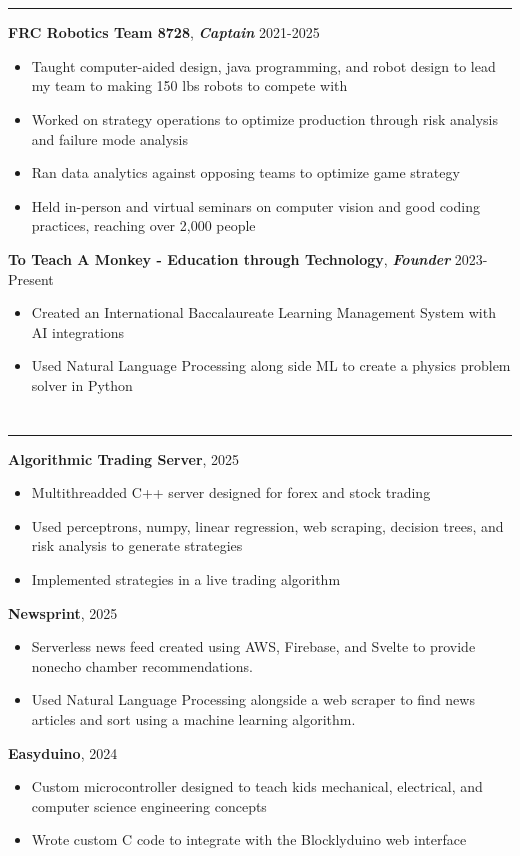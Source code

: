 \documentclass{article}[11pt]
\newcommand{\underlinedsection}[1]{ \section*{\sc{#1}}
	\rule{\textwidth}{1pt} }
\newenvironment{denseitemize}
{ \begin{itemize}[leftmargin = 20pt, topsep = 0pt, itemsep = 0pt] }
{\end{itemize} }
\newcommand{\job}[3]{ {\textbf{#1}, \textit{\textbf{#2}} \hfill {#3}} }
\begin{document}
\underlinedsection{Other experience}
\job{FRC Robotics Team 8728}{Captain}{2021-2025}
\begin{denseitemize}
	\item Taught computer-aided design, java programming, and robot design to lead my team to making 150 lbs robots to compete with
    \item Worked on strategy operations to optimize production through risk analysis and failure mode analysis
    \item Ran data analytics against opposing teams to optimize game strategy
    \item Held in-person and virtual seminars on computer vision and good coding practices, reaching over 2,000 people
\end{denseitemize}
\job{To Teach A Monkey - Education through Technology}{Founder}{2023-Present}
\begin{denseitemize}
	\item Created an International Baccalaureate Learning Management System with AI integrations
    \item Used Natural Language Processing along side ML to create a physics problem solver in Python
\end{denseitemize}
\underlinedsection{Projects}
\job{Algorithmic Trading Server}{}{2025}
\begin{denseitemize}
	\item Multithreadded C++ server designed for forex and stock trading 
    \item Used perceptrons, numpy, linear regression, web scraping, decision trees, and risk analysis to generate strategies
    \item Implemented strategies in a live trading algorithm  
\end{denseitemize}
\job{Newsprint}{}{2025}
\begin{denseitemize}
	\item Serverless news feed created using AWS, Firebase, and Svelte to provide nonecho chamber recommendations.
    \item Used Natural Language Processing alongside a web scraper to find news articles and sort using a machine learning algorithm.
\end{denseitemize}
\job{Easyduino}{}{2024}
\begin{denseitemize}
	\item Custom microcontroller designed to teach kids mechanical, electrical, and computer science engineering concepts
    \item Wrote custom C code to integrate with the Blocklyduino web interface
\end{denseitemize}
\thispagestyle{empty}
\end{document}
